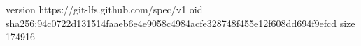 version https://git-lfs.github.com/spec/v1
oid sha256:94c0722d131514faaeb6e4e9058c4984acfe328748f455e12f608dd694f9efcd
size 174916
